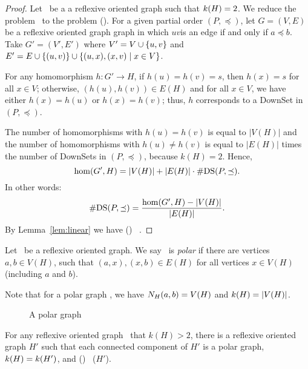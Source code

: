 \begin{proof}
Let \mH\ be a a reflexive oriented graph such that \(k(H)=2\)\@.
We reduce the problem \cdsp\ to the problem \chom(\mH)\@.
For a given partial order \((P,\preceq)\), let \(G=(V,E)\) be a reflexive oriented graph
graph in which \(uv\)is an edge if and only if \(a\preceq b\)\@. Take \(G'=(V',E')\) where
\(V'= V \cup \{{u,v}\}\) and \(E' = E \cup \{{(u,v)}\} \cup
\{{(u,x),(x,v) \mid x\in V}\}\)\@.

For any homomorphism \(h: G' \to H\), if \(h(u)=h(v)=s\), then \(h(x)=s\) for all \(x\in V\);
otherwise, \((h(u),h(v))\in E(H)\) and for all \(x\in V\), we have either 
\(h(x)=h(u)\) or \(h(x)=h(v)\); thus,
\(h\) corresponds to a DownSet in \((P,\preceq)\)\@.

The number of homomorphisms with \(h(u)=h(v)\) is equal to \(|V(H)|\) and
the number of homomorphisms with \(h(u)\neq h(v)\) is equal to \(|E(H)|\) times the 
number of DownSets in \((P,\preceq)\), because \(k(H)=2\)\@. Hence,
\[\hom(G',H) = |V(H)| + |E(H)|\cdot \#\mathrm{DS}(P,\preceq).\]
In other words:
\[\#\mathrm{DS}(P,\preceq) = \frac{\hom(G',H) - |V(H)|}{|E(H)|}.\] 
By Lemma~\ref{lem:linear} we have \chom(\mH) \mapge\ \cdsp\@.
\end{proof}

\begin{defi} 
Let \mH\ be a reflexive oriented graph. We say \mH\ is \emph{polar}
if there are vertices \(a,b\in V(H)\),
such that \((a,x), (x,b) \in E(H)\) for all vertices \(x \in V(H)\) (including \(a\) and \(b\)).
\end{defi}

Note that for a polar graph \mH, we have \(N_{H}({a},{b}) = V(H)\) and \(k(H)=|V(H)|\)\@.

\begin{figure}[h]
\center{}
\caption{A polar graph}
\end{figure}

\begin{lemma} \label{lem:k-fixing}
For any reflexive oriented graph \mH\ that \(k(H) > 2\), there is a reflexive oriented graph
\(H'\) such that each connected component of \(H'\) is a
polar graph, \(k(H) = k(H')\), and
\chom(\mH) \mapge\ \chom(\(H'\)).
\end{lemma}

